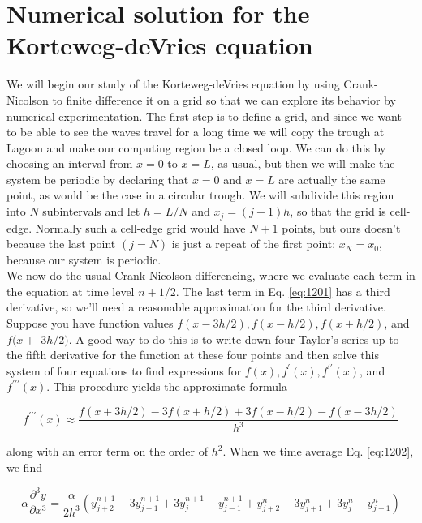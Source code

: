\section*{Numerical solution for the Korteweg-deVries equation}
We will begin our study of the Korteweg-deVries equation by using Crank-Nicolson to finite difference it on a grid so that we can explore its behavior by numerical experimentation. The first step is to define a grid, and since we want to be able to see the waves travel for a long time we will copy the trough at Lagoon and make our computing region be a closed loop. We can do this by choosing an interval from $x=0$ to $x=L$, as usual, but then we will make the system be periodic by declaring that $x=0$ and $x=L$ are actually the same point, as would be the case in a circular trough. We will subdivide this region into $N$ subintervals and let $h=L / N$ and $x_{j}=(j-1) h$, so that the grid is cell-edge. Normally such a cell-edge grid would have $N+1$ points, but ours doesn't because the last point $(j=N)$ is just a repeat of the first point: $x_{N}=x_{0}$, because our system is periodic.\\
We now do the usual Crank-Nicolson differencing, where we evaluate each term in the equation at time level $n+1 / 2$. The last term in Eq. \eqref{eq:1201} has a third derivative, so we\rq ll need a reasonable approximation for the third derivative. Suppose you have function values $f(x-3 h / 2), f(x-h / 2), f(x+h / 2)$, and $f(x+$ $3 h / 2)$. A good way to do this is to write down four Taylor's series up to the fifth derivative for the function at these four points and then solve this system of four equations to find expressions for $f(x), f^{\prime}(x), f^{\prime \prime}(x)$, and $f^{\prime \prime \prime}(x)$. This procedure yields the approximate formula

\begin{equation}\label{eq:1202}
f^{\prime \prime \prime}(x) \approx \frac{f(x+3 h / 2)-3 f(x+h / 2)+3 f(x-h / 2)-f(x-3 h / 2)}{h^{3}}
\end{equation}

along with an error term on the order of $h^{2}$. When we time average Eq. \eqref{eq:1202}, we find

\begin{equation}\label{eq:1203}
\alpha \frac{\partial^{3} y}{\partial x^{3}}=\frac{\alpha}{2 h^{3}}\left(y_{j+2}^{n+1}-3 y_{j+1}^{n+1}+3 y_{j}^{n+1}-y_{j-1}^{n+1}+y_{j+2}^{n}-3 y_{j+1}^{n}+3 y_{j}^{n}-y_{j-1}^{n}\right)
\end{equation}

